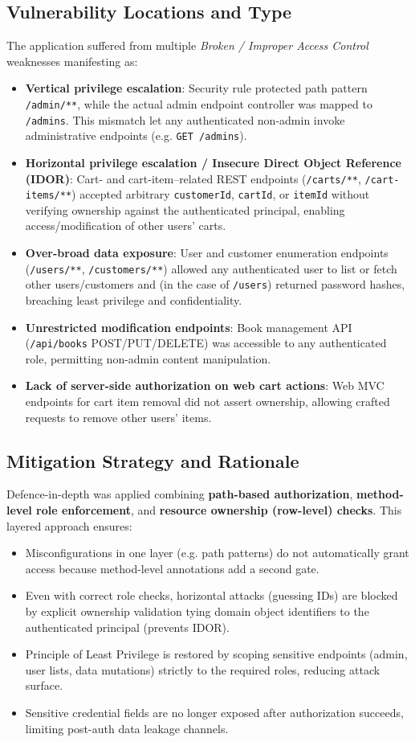 \documentclass[]{UCD_CS_FYP_Report}
\begin{document}
\subsection*{Vulnerability Locations and Type}
The application suffered from multiple \textit{Broken / Improper Access Control} weaknesses manifesting as:
\begin{itemize}
	\item \textbf{Vertical privilege escalation}: Security rule protected path pattern \texttt{/admin/**}, while the actual admin endpoint controller was mapped to \texttt{/admins}. This mismatch let any authenticated non-admin invoke administrative endpoints (e.g. \texttt{GET /admins}).
	\item \textbf{Horizontal privilege escalation / Insecure Direct Object Reference (IDOR)}: Cart- and cart-item–related REST endpoints (\texttt{/carts/**}, \texttt{/cart-items/**}) accepted arbitrary \texttt{customerId}, \texttt{cartId}, or \texttt{itemId} without verifying ownership against the authenticated principal, enabling access/modification of other users' carts.
	\item \textbf{Over-broad data exposure}: User and customer enumeration endpoints (\texttt{/users/**}, \texttt{/customers/**}) allowed any authenticated user to list or fetch other users/customers and (in the case of \texttt{/users}) returned password hashes, breaching least privilege and confidentiality.
	\item \textbf{Unrestricted modification endpoints}: Book management API (\texttt{/api/books} POST/PUT/DELETE) was accessible to any authenticated role, permitting non-admin content manipulation.
	\item \textbf{Lack of server-side authorization on web cart actions}: Web MVC endpoints for cart item removal did not assert ownership, allowing crafted requests to remove other users' items.
\end{itemize}

\subsection*{Mitigation Strategy and Rationale}
Defence-in-depth was applied combining \textbf{path-based authorization}, \textbf{method-level role enforcement}, and \textbf{resource ownership (row-level) checks}. This layered approach ensures:
\begin{itemize}
	\item Misconfigurations in one layer (e.g. path patterns) do not automatically grant access because method-level annotations add a second gate.
	\item Even with correct role checks, horizontal attacks (guessing IDs) are blocked by explicit ownership validation tying domain object identifiers to the authenticated principal (prevents IDOR).
	\item Principle of Least Privilege is restored by scoping sensitive endpoints (admin, user lists, data mutations) strictly to the required roles, reducing attack surface.
	\item Sensitive credential fields are no longer exposed after authorization succeeds, limiting post-auth data leakage channels.
\end{itemize}
\end{document}
